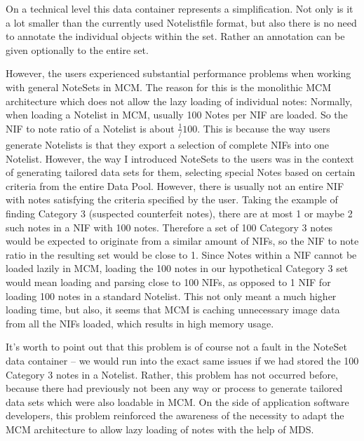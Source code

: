 On a technical level this data container represents a simplification. Not only is it a lot smaller than the currently used Notelistfile format, but also there is no need to annotate the individual objects within the set. Rather an annotation can be given optionally to the entire set. \par
However, the users experienced substantial performance problems when working with general NoteSets in MCM. The reason for this is the monolithic MCM architecture which does not allow the lazy loading of individual notes: Normally, when loading a Notelist in MCM, usually 100 Notes per NIF are loaded. So the NIF to note ratio of a Notelist is about $\frac{1}/{100}$. This is because the way users generate Notelists is that they export a selection of complete NIFs into one Notelist. However, the way I introduced NoteSets to the users was in the context of generating tailored data sets for them, selecting special Notes based on certain criteria from the entire Data Pool. However, there is usually not an entire NIF with notes satisfying the criteria specified by the user. Taking the example of finding Category 3 (suspected counterfeit notes), there are at most 1 or maybe 2 such notes in a NIF with 100 notes. Therefore a set of 100 Category 3 notes would be expected to originate from a similar amount of NIFs, so the NIF to note ratio in the resulting set would be close to 1. Since Notes within a NIF cannot be loaded lazily in MCM, loading the 100 notes in our hypothetical Category 3 set would mean loading and parsing close to 100 NIFs, as opposed to 1 NIF for loading 100 notes in a standard Notelist. This not only meant a much higher loading time, but also, it seems that MCM is caching unnecessary image data from all the NIFs loaded, which results in high memory usage. \par
It's worth to point out that this problem is of course not a fault in the NoteSet data container -- we would run into the exact same issues if we had stored the 100 Category 3 notes in a Notelist. Rather, this problem has not occurred before, because there had previously not been any way or process to generate tailored data sets which were also loadable in MCM. On the side of application software developers, this problem reinforced the awareness of the necessity to adapt the MCM architecture to allow lazy loading of notes with the help of MDS. \par


